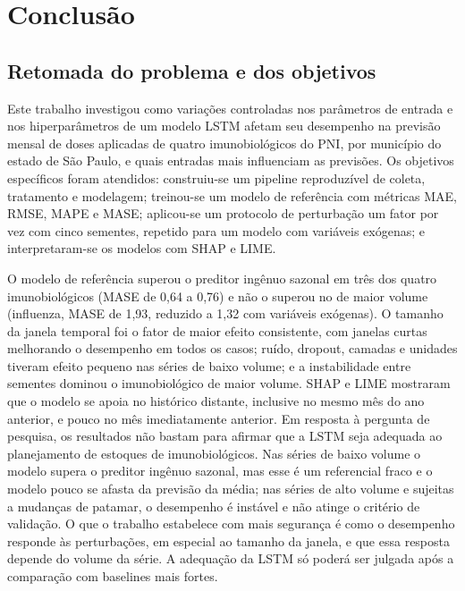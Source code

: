 \documentclass[
    12pt,
    openright,
    oneside,
    a4paper,
    english,
    brazil
]{abntex2}
\begin{document}
\chapter{Conclusão}

\section{Retomada do problema e dos objetivos}

Este trabalho investigou como variações controladas nos parâmetros de entrada e nos hiperparâmetros de um modelo LSTM afetam seu desempenho na previsão mensal de doses aplicadas de quatro imunobiológicos do PNI, por município do estado de São Paulo, e quais entradas mais influenciam as previsões. Os objetivos específicos foram atendidos: construiu-se um pipeline reproduzível de coleta, tratamento e modelagem; treinou-se um modelo de referência com métricas MAE, RMSE, MAPE e MASE; aplicou-se um protocolo de perturbação um fator por vez com cinco sementes, repetido para um modelo com variáveis exógenas; e interpretaram-se os modelos com SHAP e LIME.

O modelo de referência superou o preditor ingênuo sazonal em três dos quatro imunobiológicos (MASE de 0,64 a 0,76) e não o superou no de maior volume (influenza, MASE de 1,93, reduzido a 1,32 com variáveis exógenas). O tamanho da janela temporal foi o fator de maior efeito consistente, com janelas curtas melhorando o desempenho em todos os casos; ruído, dropout, camadas e unidades tiveram efeito pequeno nas séries de baixo volume; e a instabilidade entre sementes dominou o imunobiológico de maior volume. SHAP e LIME mostraram que o modelo se apoia no histórico distante, inclusive no mesmo mês do ano anterior, e pouco no mês imediatamente anterior. Em resposta à pergunta de pesquisa, os resultados não bastam para afirmar que a LSTM seja adequada ao planejamento de estoques de imunobiológicos. Nas séries de baixo volume o modelo supera o preditor ingênuo sazonal, mas esse é um referencial fraco e o modelo pouco se afasta da previsão da média; nas séries de alto volume e sujeitas a mudanças de patamar, o desempenho é instável e não atinge o critério de validação. O que o trabalho estabelece com mais segurança é como o desempenho responde às perturbações, em especial ao tamanho da janela, e que essa resposta depende do volume da série. A adequação da LSTM só poderá ser julgada após a comparação com baselines mais fortes.
\end{document}

